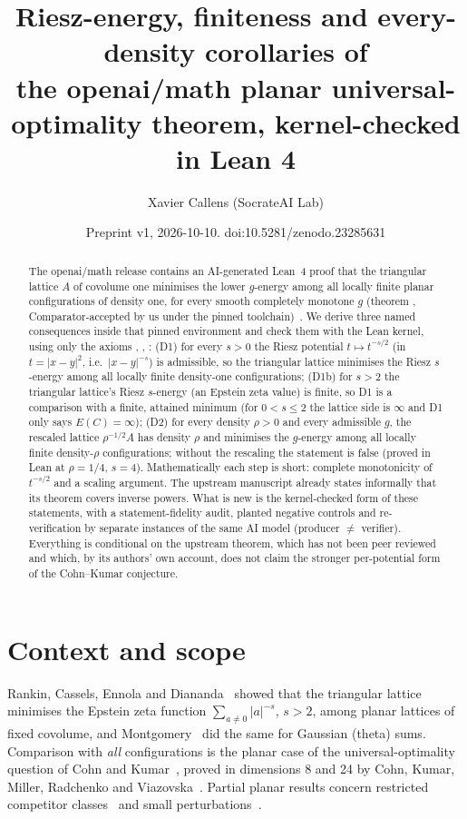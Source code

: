 \documentclass[11pt]{article}
\title{Riesz-energy, finiteness and every-density corollaries of\\
the openai/math planar universal-optimality theorem, kernel-checked in Lean 4}
\author{Xavier Callens (SocrateAI Lab)}
\date{Preprint v1, 2026-10-10. doi:10.5281/zenodo.23285631}
\begin{document}
\maketitle

\begin{abstract}
The openai/math release contains an AI-generated Lean~4 proof that the triangular lattice $A$ of covolume one minimises the lower
$g$-energy among all locally finite planar configurations of density one, for every smooth completely monotone $g$
(theorem , Comparator-accepted by us under the pinned toolchain)~\cite{oai,oaicert}. We derive three named
consequences inside that pinned environment and check them with the Lean kernel, using only the axioms
, , :
(D1) for every $s>0$ the Riesz potential $t\mapsto t^{-s/2}$ (in $t=|x-y|^2$, i.e.\ $|x-y|^{-s}$) is admissible, so the triangular lattice minimises the Riesz $s$-energy among
all locally finite density-one configurations;
(D1b) for $s>2$ the triangular lattice's Riesz $s$-energy (an Epstein zeta value) is finite, so D1 is a comparison with a finite, attained minimum
(for $0<s\le2$ the lattice side is $\infty$ and D1 only says $E(C)=\infty$);
(D2) for every density $\rho>0$ and every admissible $g$, the rescaled lattice $\rho^{-1/2}A$ has density $\rho$ and minimises the
$g$-energy among all locally finite density-$\rho$ configurations; without the rescaling the statement is false (proved in Lean at $\rho=1/4$, $s=4$).
Mathematically each step is short: complete monotonicity of $t^{-s/2}$ and a scaling argument. The upstream manuscript already states
informally that its theorem covers inverse powers. What is new is the kernel-checked form of these statements, with a statement-fidelity
audit, planted negative controls and re-verification by separate instances of the same AI model (producer $\neq$ verifier). Everything is conditional on the upstream theorem, which has not been
peer reviewed and which, by its authors' own account, does not claim the stronger per-potential form of the Cohn--Kumar
conjecture.
\end{abstract}

\section{Context and scope}

Rankin, Cassels, Ennola and Diananda~\cite{rankin,cassels,casselsc,ennola,diananda} showed that the triangular lattice minimises the
Epstein zeta function $\sum_{a\neq0}|a|^{-s}$, $s>2$, among planar lattices of fixed covolume, and Montgomery~\cite{montgomery} did the same
for Gaussian (theta) sums. Comparison with \emph{all} configurations is the planar case of the universal-optimality question of
Cohn and Kumar~\cite[Conj.~9.4]{ck}, proved in dimensions 8 and 24 by Cohn, Kumar, Miller, Radchenko and Viazovska~\cite{ckmrv}. Partial
planar results concern restricted competitor classes~\cite{hardin} and small perturbations~\cite{leble}.
\end{document}
